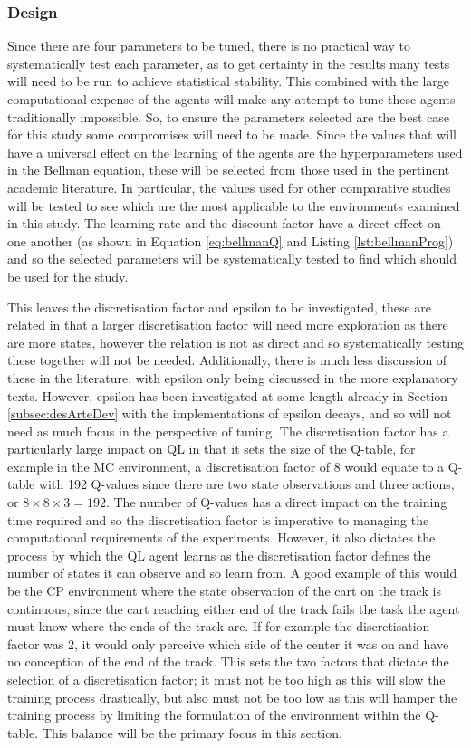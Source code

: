 \documentclass[hidelinks,journal]{IEEEtran}
\begin{document}
\subsubsection{Design}
\label{subsubsec:desAgentTuningDes}
Since there are four parameters to be tuned, there is no practical way to systematically test each parameter, as to get certainty in the results many tests will need to be run to achieve statistical stability. This combined with the large computational expense of the agents will make any attempt to tune these agents traditionally impossible. So, to ensure the parameters selected are the best case for this study some compromises will need to be made. Since the values that will have a universal effect on the learning of the agents are the hyperparameters used in the Bellman equation, these will be selected from those used in the pertinent academic literature. In particular, the values used for other comparative studies will be tested  to see which are the most applicable to the environments examined in this study. The learning rate and the discount factor have a direct effect on one another (as shown in Equation \ref{eq:bellmanQ} and Listing \ref{lst:bellmanProg}) and so the selected parameters will be systematically tested to find which should be used for the study.

This leaves the discretisation factor and epsilon to be investigated, these are related in that a larger discretisation factor will need more exploration as there are more states, however the relation is not as direct and so systematically testing these together will not be needed. Additionally, there is much less discussion of these in the literature, with epsilon only being discussed in the more explanatory texts. However, epsilon has been investigated at some length already in Section \ref{subsec:desArteDev} with the implementations of epsilon decays, and so will not need as much focus in the perspective of tuning. The discretisation factor has a particularly large impact on QL in that it sets the size of the Q-table, for example in the MC environment, a discretisation factor of 8 would equate to a Q-table with 192 Q-values since there are two state observations and three actions, or $8 \times 8 \times 3=192$. The number of Q-values has a direct impact on the training time required and so the discretisation factor is imperative to managing the computational requirements of the experiments. However, it also dictates the process by which the QL agent learns as the discretisation factor defines the number of states it can observe and so learn from. A good example of this would be the CP environment where the state observation of the cart on the track is continuous, since the cart reaching either end of the track fails the task the agent must know where the ends of the track are. If for example the discretisation factor was 2, it would only perceive which side of the center it was on and have no conception of the end of the track. This sets the two factors that dictate the selection of a discretisation factor; it must not be too high as this will slow the training process drastically, but also must not be too low as this will hamper the training process by limiting the formulation of the environment within the Q-table. This balance will be the primary focus in this section.
\end{document}
